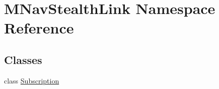 \hypertarget{namespace_m_nav_stealth_link}{}\section{M\+Nav\+Stealth\+Link Namespace Reference}
\label{namespace_m_nav_stealth_link}
\subsection*{Classes}
\begin{DoxyCompactItemize}
\item 
class \hyperlink{class_m_nav_stealth_link_1_1_subscription}{Subscription}
\end{DoxyCompactItemize}
